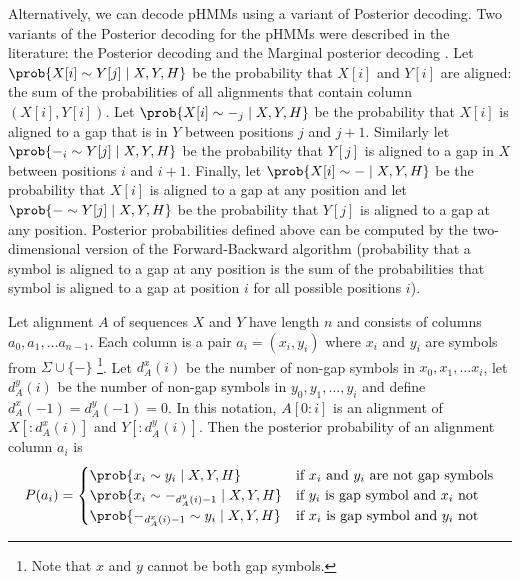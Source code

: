 Alternatively, we can decode pHMMs using a variant of Posterior decoding.  Two
variants of the Posterior decoding for the pHMMs were described in the
literature: the Posterior decoding and the Marginal posterior decoding
\cite{Lunter2008}.  Let $\prob{X[i]\sim Y[j]\mid X,Y,H}$ be the probability that
$X[i]$ and $Y[i]$ are aligned: the sum of the probabilities of all alignments
that
contain column $(X[i],Y[i])$. Let $\prob{X[i]\sim -_j\mid X,Y,H}$ be the
probability that $X[i]$ is aligned to a gap that is in $Y$ between positions $j$
and $j+1$. Similarly let $\prob{-_i\sim Y[j]\mid X,Y,H}$ be the probability that $Y[j]$
is aligned to a gap in $X$ between positions $i$ and $i+1$. Finally, let
$\prob{X[i]\sim - \mid X,Y,H}$ be the probability that $X[i]$ is aligned to a
gap at any position and let $\prob{-\sim Y[j]\mid X,Y,H}$ be the probability
that $Y[j]$ is aligned to a gap at any position.  Posterior probabilities
defined above can be computed by the two-dimensional version of the
Forward-Backward algorithm (probability that a symbol is aligned to a gap at any position
is the sum of the probabilities that symbol is aligned to a gap at position $i$
for all possible positions $i$).

Let alignment $A$ of sequences $X$ and $Y$ have length $n$ and
consists of columns $a_0,a_1,\dots a_{n-1}$. Each column is a pair
$a_i=(x_i,y_i)$ where $x_i$ and $y_i$ are symbols from $\Sigma\cup\{-\}$ \footnote{Note that $x$ and $y$ cannot be both gap symbols.}.
Let $d_A^x(i)$ be the number of non-gap symbols in $x_0,x_1,\dots x_{i}$,
let $d_A^y(i)$ be the number of non-gap symbols in $y_0,y_1,\dots, y_{i}$ and
define $d_A^x(-1)=d_A^y(-1)=0$. In this notation, $A[0:i]$ is an alignment of $X[:d_A^x(i)]$ 
and $Y[:d_A^y(i)]$. Then the posterior probability of an alignment column $a_i$ is
\[P(a_i)=
\begin{cases}
\prob{x_i\sim y_i\mid X,Y,H} & \text{if $x_i$ and $y_i$ are not gap symbols}\\
\prob{x_i\sim -_{d_A^y(i)-1}\mid X,Y,H}  & \text{if $y_i$ is gap symbol and $x_i$ not}\\
\prob{-_{d_A^x(i)-1}\sim y_i\mid X,Y,H}  & \text{if $x_i$ is gap symbol and $y_i$ not}
\end{cases}
\]

